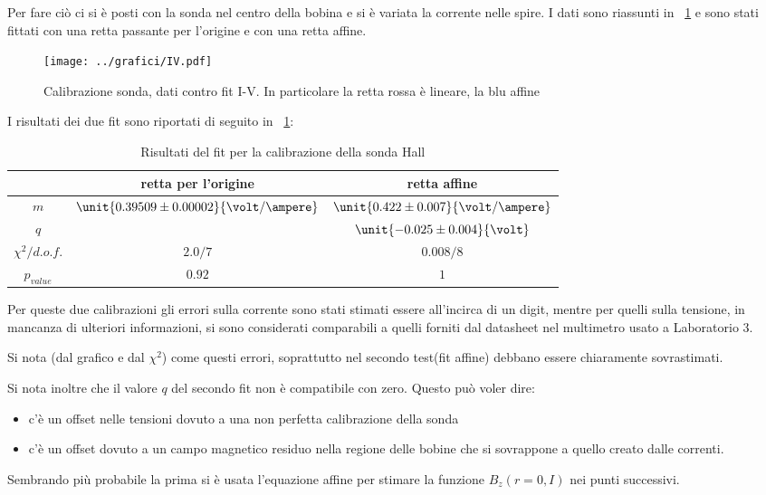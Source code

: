 \documentclass[10pt,a4paper]{article}
\begin{document}
Per fare ciò ci si è posti con la sonda nel centro della bobina e si è variata la corrente nelle spire. I dati sono riassunti in \figurename{~\ref{fig:Hallcal}} e sono stati fittati con una retta passante per l'origine e con una retta affine. 

\begin{figure}[H]
	\centering
	\texttt{[image: ../grafici/IV.pdf]}
	\caption{Calibrazione sonda, dati contro fit I-V. In particolare la retta rossa è lineare, la blu affine}
	\label{fig:Hallcal}
\end{figure}

I risultati dei due fit sono riportati di seguito in \tablename{~\ref{tab:Hallcal}}:

\begin{table}[H]
	\centering
	\begin{tabular}{c|c|c}
			& retta per l'origine & retta affine\\
		\hline
		$m$ & $\unit{0.39509 \pm 0.00002}{\volt/\ampere}$ & $\unit{0.422 \pm 0.007}{\volt/\ampere}$ \\
		$q$ & \ & $\unit{-0.025 \pm 0.004}{\volt}$\\
		$\chi^2/d.o.f.$ & $2.0/7$ & $0.008/8$ \\
		$p_{value}$ & $0.92$ & $1$\\
	\end{tabular}
	\caption{Risultati del fit per la calibrazione della sonda Hall}
	\label{tab:Hallcal}
\end{table}

Per queste due calibrazioni gli errori sulla corrente sono stati stimati essere all'incirca di un digit, mentre per quelli sulla tensione, in mancanza di ulteriori informazioni, si sono considerati comparabili a quelli forniti dal datasheet nel multimetro usato a Laboratorio 3.

Si nota (dal grafico e dal $\chi^2$) come questi errori, soprattutto nel secondo test(fit affine) debbano essere chiaramente sovrastimati.


Si nota inoltre che il valore $q$ del secondo fit non è compatibile con zero. Questo può voler dire:
\begin{itemize}
\item c'è un offset nelle tensioni dovuto a una non perfetta calibrazione della sonda
\item c'è un offset dovuto a un campo magnetico residuo nella regione delle bobine che si sovrappone a quello creato dalle correnti.
\end{itemize}
Sembrando più probabile la prima si è usata l'equazione affine per stimare la funzione $B_z(r=0, I)$ nei punti successivi.
\end{document}
